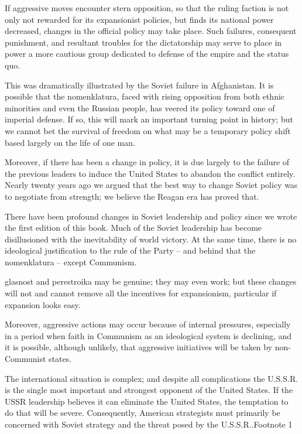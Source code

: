 \documentclass[a4paper,12pt]{book}
\begin{document}
If aggressive moves encounter stern opposition, so that the ruling faction is not only not rewarded for its expansionist policies, but finds its national power decreased, changes in the official policy may take place. Such failures, consequent punishment, and resultant troubles for the dictatorship may serve to place in power a more cautious group dedicated to defense of the empire and the status quo.

This was dramatically illustrated by the Soviet failure in Afghanistan.
It is possible that the nomenklatura, faced with rising opposition from both ethnic minorities and even the Russian people, has veered its policy toward one of imperial defense. If so, this will mark an important turning point in history; but we cannot bet the survival of freedom on what may be a temporary policy shift based largely on the life of one man.

Moreover, if there has been a change in policy, it is due largely to the failure of the previous leaders to induce the United States to abandon the conflict entirely. Nearly twenty years ago we argued that the best way to change Soviet policy was to negotiate from strength; we believe the Reagan era has proved that.

There have been profound changes in Soviet leadership and policy since we wrote the first edition of this book. Much of the Soviet leadership has become disillusioned with the inevitability of world victory. At the same time, there is no ideological justification to the rule of the Party -- and behind that the nomenklatura -- except Communism.

glasnost and perestroika may be genuine; they may even work; but these changes will not and cannot remove all the incentives for expansionism, particular if expansion looks easy.

Moreover, aggressive actions may occur because of internal pressures, especially in a period when faith in Communism as an ideological system is declining, and it is possible, although unlikely, that aggressive initiatives will be taken by non-Communist states.

The international situation is complex; and despite all complications the U.S.S.R. is the single most important and strongest opponent of the United States. If the USSR leadership believes it can eliminate the United States, the temptation to do that will be severe. Consequently, American strategists must primarily be concerned with Soviet strategy and the threat posed by the U.S.S.R..Footnote 1
\end{document}
